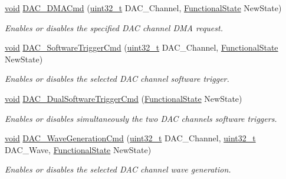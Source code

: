 \begin{DoxyCompactItemize}
\hyperlink{usb__devapi_8h_afabf60e7f57651d6d595a02c75f07cd0}{void} \hyperlink{group___d_a_c___exported___functions_ga194cba38f60ace11658824f0250121f4}{D\+A\+C\+\_\+\+D\+M\+A\+Cmd} (\hyperlink{_p_e___types_8h_a33594304e786b158f3fb30289278f5af}{uint32\+\_\+t} D\+A\+C\+\_\+\+Channel, \hyperlink{agilefox_2library_2inc_2stm32f10x__type_8h_ac9a7e9a35d2513ec15c3b537aaa4fba1}{Functional\+State} New\+State)
\begin{DoxyCompactList}\small\item\em Enables or disables the specified D\+AC channel D\+MA request. \end{DoxyCompactList}\item 
\hyperlink{usb__devapi_8h_afabf60e7f57651d6d595a02c75f07cd0}{void} \hyperlink{group___d_a_c___exported___functions_ga46f9f7f6b9520a86e300fe966afe5fb3}{D\+A\+C\+\_\+\+Software\+Trigger\+Cmd} (\hyperlink{_p_e___types_8h_a33594304e786b158f3fb30289278f5af}{uint32\+\_\+t} D\+A\+C\+\_\+\+Channel, \hyperlink{agilefox_2library_2inc_2stm32f10x__type_8h_ac9a7e9a35d2513ec15c3b537aaa4fba1}{Functional\+State} New\+State)
\begin{DoxyCompactList}\small\item\em Enables or disables the selected D\+AC channel software trigger. \end{DoxyCompactList}\item 
\hyperlink{usb__devapi_8h_afabf60e7f57651d6d595a02c75f07cd0}{void} \hyperlink{group___d_a_c___exported___functions_gab4d3b364a6b184dcd65f3b294ebf56dc}{D\+A\+C\+\_\+\+Dual\+Software\+Trigger\+Cmd} (\hyperlink{agilefox_2library_2inc_2stm32f10x__type_8h_ac9a7e9a35d2513ec15c3b537aaa4fba1}{Functional\+State} New\+State)
\begin{DoxyCompactList}\small\item\em Enables or disables simultaneously the two D\+AC channels software triggers. \end{DoxyCompactList}\item 
\hyperlink{usb__devapi_8h_afabf60e7f57651d6d595a02c75f07cd0}{void} \hyperlink{group___d_a_c___exported___functions_gabd51ae6880821d4dcd923969ec19a19e}{D\+A\+C\+\_\+\+Wave\+Generation\+Cmd} (\hyperlink{_p_e___types_8h_a33594304e786b158f3fb30289278f5af}{uint32\+\_\+t} D\+A\+C\+\_\+\+Channel, \hyperlink{_p_e___types_8h_a33594304e786b158f3fb30289278f5af}{uint32\+\_\+t} D\+A\+C\+\_\+\+Wave, \hyperlink{agilefox_2library_2inc_2stm32f10x__type_8h_ac9a7e9a35d2513ec15c3b537aaa4fba1}{Functional\+State} New\+State)
\begin{DoxyCompactList}\small\item\em Enables or disables the selected D\+AC channel wave generation. \end{DoxyCompactList}\item 

\end{DoxyCompactItemize}
